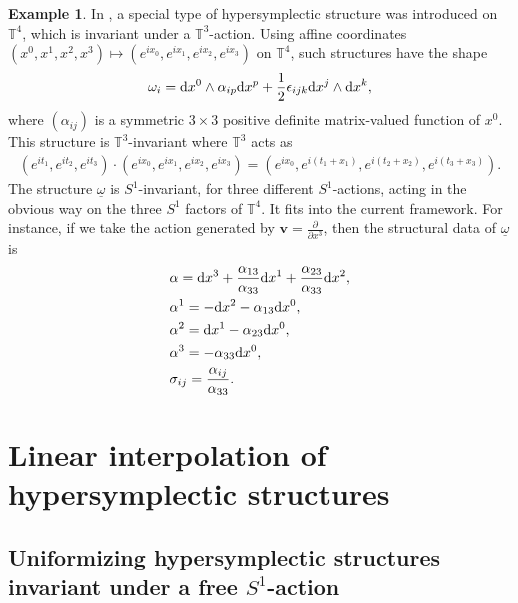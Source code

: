 \documentclass[11pt]{amsart}
\newcommand{\diff}{\text{\rm d}}
\theoremstyle{plain}
\theoremstyle{definition}
\newtheorem{example}[theorem]{Example}
\theoremstyle{plain}
\theoremstyle{definition}
\numberwithin{equation}{section}
\numberwithin{theorem}{section}
\begin{document}
\begin{example}\label{example}
In \cite{FHY}, a special type of hypersymplectic structure was introduced  on $\mathbb{T}^4$, which is invariant under a $\mathbb{T}^3$-action. Using affine coordinates $(x^0,x^1, x^2,x^3) \mapsto (e^{ix_0},e^{ix_1},e^{ix_2},e^{ix_3})$ on $\mathbb{T}^4$, such structures have the shape
\begin{align*}
\omega_i = \diff x^0 \wedge \alpha_{ip}\diff x^p + \frac{1}{2} \epsilon_{ijk}\diff x^{j}\wedge \diff x^k,
\end{align*}
where $\left( \alpha_{ij}\right)$ is a symmetric $3\times 3$ positive definite matrix-valued function of $x^0$. This structure is $\mathbb{T}^3$-invariant where $\mathbb{T}^3$ acts as 
\begin{align*}
    \left(e^{it_1}, e^{it_2}, e^{it_3}\right)\cdot \left( e^{ix_0}, e^{ix_1}, e^{ix_2}, e^{ix_3}\right) = \left( e^{ix_0}, e^{i(t_1+ x_1)}, e^{i(t_2+x_2)}, e^{i(t_3+x_3)}\right). 
\end{align*}
The structure $\underline\omega$ is $S^1$-invariant, for three different $S^1$-actions, acting in the obvious way on the three $S^1$ factors of $\mathbb{T}^4$. It fits into the current framework. For instance, if we take the action generated by $\bm v=\frac{\partial}{\partial x^3}$, then the structural data of $\underline{\omega}$ is
\begin{equation*}
\begin{split}
& \alpha 
 = 
\diff x^3 + \frac{\alpha_{13}}{\alpha_{33}} \diff x^1 + \frac{\alpha_{23}}{\alpha_{33}} \diff x^2,\\
&\alpha^1 
 = 
- \diff x^2 -\alpha_{13}\diff x^0,\\
&\alpha^2 
 = 
\diff x^1- \alpha_{23}\diff x^0,\\
&\alpha^3 
 = 
-\alpha_{33} \diff x^0,\\
&\sigma_{ij}
=
 \frac{\alpha_{ij}}{\alpha_{33}}. 
\end{split}
\end{equation*}
\end{example}

\section{Linear interpolation of hypersymplectic structures}
\subsection{Uniformizing hypersymplectic structures invariant under a free $S^1$-action}
\end{document}
